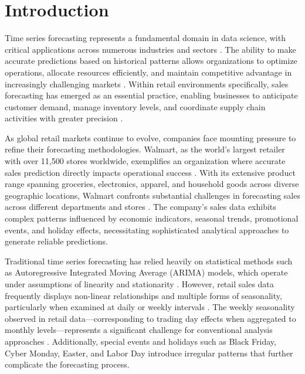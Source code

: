 %
%
%
 

\chapter{Introduction}


Time series forecasting represents a fundamental domain in data science, with critical applications across numerous industries and sectors \cite{Fildes:2019}. The ability to make accurate predictions based on historical patterns allows organizations to optimize operations, allocate resources efficiently, and maintain competitive advantage in increasingly challenging markets \cite{Pao:2017}. Within retail environments specifically, sales forecasting has emerged as an essential practice, enabling businesses to anticipate customer demand, manage inventory levels, and coordinate supply chain activities with greater precision \cite{Zhang:2021}.

As global retail markets continue to evolve, companies face mounting pressure to refine their forecasting methodologies. Walmart, as the world's largest retailer with over 11,500 stores worldwide, exemplifies an organization where accurate sales prediction directly impacts operational success \cite{Zhang:2021}. With its extensive product range spanning groceries, electronics, apparel, and household goods across diverse geographic locations, Walmart confronts substantial challenges in forecasting sales across different departments and stores \cite{Loyal:2017}. The company's sales data exhibits complex patterns influenced by economic indicators, seasonal trends, promotional events, and holiday effects, necessitating sophisticated analytical approaches to generate reliable predictions.

Traditional time series forecasting has relied heavily on statistical methods such as Autoregressive Integrated Moving Average (ARIMA) models, which operate under assumptions of linearity and stationarity \cite{Pao:2017}. However, retail sales data frequently displays non-linear relationships and multiple forms of seasonality, particularly when examined at daily or weekly intervals \cite{McElroy:2018}. The weekly seasonality observed in retail data—corresponding to trading day effects when aggregated to monthly levels—represents a significant challenge for conventional analysis approaches \cite{McElroy:2018}. Additionally, special events and holidays such as Black Friday, Cyber Monday, Easter, and Labor Day introduce irregular patterns that further complicate the forecasting process.

